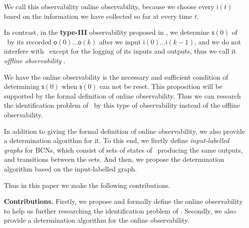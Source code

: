We call this observability online observability, because we choose every $\mathsf{i}(t)$ based on the information we have collected so far at every time $t$. 

In contrast, in the {\bf type-III} observability proposed in \cite{Cheng2011Identification}, we determine $\mathsf{s}(0)$ of \BCN\ by its recorded $\mathsf{o}(0)\ldots\mathsf{o}(k)$ after we input $\mathsf{i}(0)\ldots\mathsf{i}(k-1)$, and  we do not interfere with \BCN\ except for the logging of its inputs and outputs, thus we call it {\em offline observability} \cite{Cassar2017A}.
 
 We have the online observability is the necessary and sufficient condition of determining $\mathsf{s}(0)$ when $\mathsf{s}(0)$ can not be reset. This proposition will be supported by the formal definition of  online observability.  Thus we can research the identification problem of \BCNs\ by this type of observability instead of the offline observability.




In addition to giving the formal definition of online observability, we also provide a determination algorithm for it. To this end, we firstly define {\em input-labelled graphs} for BCNs, which consist of sets of states of \BCNs\ producing the same outputs, and transitions between the sets. And then, we propose the determination algorithm based on the input-labelled graph.

Thus in this paper we make the following contributions.

\medskip\noindent
{\bf Contributions.}
Firstly, we propose and formally define the online observability to help us further researching the identification problem of \BCNs. %
Secondly, we also provide a determination algorithm for the online observability. %

